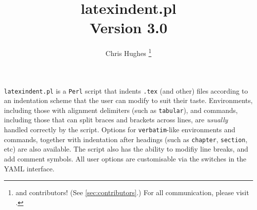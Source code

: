 \documentclass[10pt]{article}
\begin{document}
\title{\ttfamily\bfseries latexindent.pl\\[1cm] Version 3.0}
\author{Chris Hughes \footnote{and contributors! (See \vref{sec:contributors}.) For
		all communication, please visit \cite{latexindent-home}.}}
\maketitle
\begin{adjustwidth}{1cm}{1cm}
  \small
	\texttt{latexindent.pl} is a \texttt{Perl} script that indents \texttt{.tex} (and other)
	files according to an indentation scheme that the user can modify to suit their
	taste. Environments, including those with alignment delimiters (such as \texttt{tabular}),
	and commands, including those that can split braces and brackets across lines,
	are \emph{usually} handled correctly by the script. Options for \texttt{verbatim}-like
	environments and commands, together with indentation after headings (such as \lstinline!chapter!, \lstinline!section!, etc)
	are also available. The script also has the ability to modifiy line breaks, and add
	comment symbols. All user options are customisable via the switches in the YAML interface.
\end{adjustwidth}
\tableofcontents
{\small
	\lstlistoflistings
}













\stopcontents[noAdditionalIndent]



\end{document}

